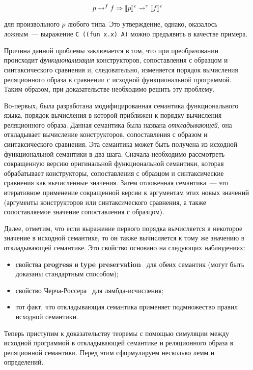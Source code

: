 $$
p\leadsto^f f \Rightarrow \llbracket{p}\rrbracket^c\leadsto^r\llbracket{f}\rrbracket^c
$$

\noindent для произвольного $p$ любого типа. Это утверждение, однако, оказалось ложным~--- выражение
\lstinline|C ((fun x.x) A)| можно предъявить в качестве примера.

Причина данной проблемы заключается в том, что при преобразовании происходит \emph{функционализация} конструкторов, сопоставления с образцом и синтаксического сравнения и, следовательно, изменяется порядок вычисления реляционного образа в сравнении с исходной функциональной программой. Таким образом, при доказательстве необходимо решить эту проблему.

Во-первых, была разработана модифицированная семантика функционального языка, порядок вычисления в которой приближен к порядку вычисления реляционного образа. Данная семантика была названа \emph{откладывающей}, она откладывает вычисление конструкторов, сопоставления с образом и синтаксического сравнения. Эта семантика может быть получена из исходной функциональной семантики в два шага. Сначала необходимо рассмотреть сокращенную версию оригинальной функциональной семантики, которая обрабатывает конструкторы, сопоставления с образцом и синтаксические сравнения как вычисленные значения. Затем отложенная семантика~--- это итеративное применение сокращенной версии к аргументам этих новых значений (аргументы конструкторов или синтаксического сравнения, а также сопоставляемое значение сопоставления с образцом).

Далее, отметим, что если выражение первого порядка вычисляется в некоторое значение в исходной семантике, то он также вычисляется к тому же значению в откладывающей семантике. Это свойство основано на следующих наблюдениях:

\begin{itemize}
\item \vskip-2mm свойства {\bf progress} и {\bf type preservation}~\cite{lozov-spbu:poly} для обеих семантик (могут быть доказаны стандартным способом);
\item свойство Черча-Россера~\cite{lozov-spbu:poly, lozov-spbu:ChurchRosser} для лямбда-исчисления;
\item тот факт, что откладывающая семантика применяет подмножество правил исходной семантики.
\end{itemize}
\vskip-2mm
Теперь приступим к доказательству теоремы с помощью симуляции между исходной программой в откладывающей семантике и реляционного образа в реляционной семантики. Перед этим сформулируем несколько лемм и
определений.

